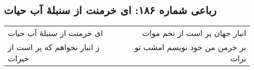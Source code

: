 \begin{center}
\section*{رباعی شماره ۱۸۶: ای خرمنت از سنبلهٔ آب حیات}
\label{sec:0186}
\begin{longtable}{l p{0.5cm} r}
ای خرمنت از سنبلهٔ آب حیات
&&
انبار جهان پر است از تخم موات
\\
ز انبار نخواهم که پر است از خیرات
&&
بر خرمن من خود نویسم امشب تو برات
\\
\end{longtable}
\end{center}

